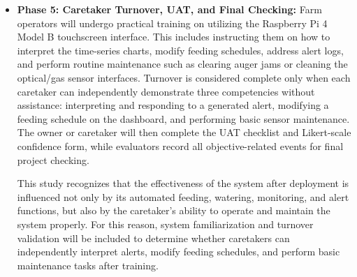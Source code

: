 \begin{itemize}
  \item \textbf{Phase 5: Caretaker Turnover, UAT, and Final Checking:} Farm operators will undergo practical training on utilizing the Raspberry Pi 4 Model B touchscreen interface. This includes instructing them on how to interpret the time-series charts, modify feeding schedules, address alert logs, and perform routine maintenance such as clearing auger jams or cleaning the optical/gas sensor interfaces. Turnover is considered complete only when each caretaker can independently demonstrate three competencies without assistance: interpreting and responding to a generated alert, modifying a feeding schedule on the dashboard, and performing basic sensor maintenance. The owner or caretaker will then complete the UAT checklist and Likert-scale confidence form, while evaluators record all objective-related events for final project checking.

    This study recognizes that the effectiveness of the system after deployment is influenced not only by its automated feeding, watering, monitoring, and alert functions, but also by the caretaker’s ability to operate and maintain the system properly. For this reason, system familiarization and turnover validation will be included to determine whether caretakers can independently interpret alerts, modify feeding schedules, and perform basic maintenance tasks after training.
\end{itemize}
